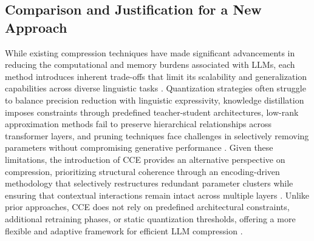 \subsection{Comparison and Justification for a New Approach}
While existing compression techniques have made significant advancements in reducing the computational and memory burdens associated with LLMs, each method introduces inherent trade-offs that limit its scalability and generalization capabilities across diverse linguistic tasks \cite{sato2024reducing}. Quantization strategies often struggle to balance precision reduction with linguistic expressivity, knowledge distillation imposes constraints through predefined teacher-student architectures, low-rank approximation methods fail to preserve hierarchical relationships across transformer layers, and pruning techniques face challenges in selectively removing parameters without compromising generative performance \cite{gomez2024enhancing}. Given these limitations, the introduction of CCE provides an alternative perspective on compression, prioritizing structural coherence through an encoding-driven methodology that selectively restructures redundant parameter clusters while ensuring that contextual interactions remain intact across multiple layers \cite{tippins2024domain}. Unlike prior approaches, CCE does not rely on predefined architectural constraints, additional retraining phases, or static quantization thresholds, offering a more flexible and adaptive framework for efficient LLM compression \cite{hawks2024neural}.